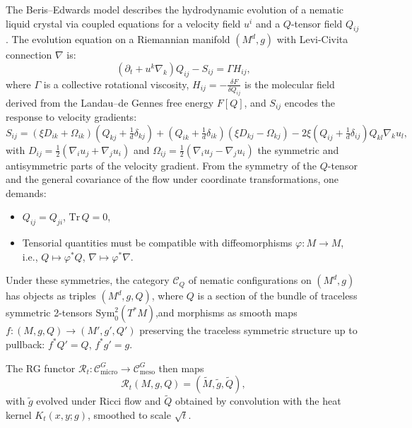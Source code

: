 	The Beris–Edwards model describes the hydrodynamic evolution of a nematic liquid crystal via coupled equations for a velocity field \( u^i \) and a \( Q \)-tensor field \( Q_{ij} \). The evolution equation on a Riemannian manifold \( (M^d, g) \) with Levi-Civita connection \( \nabla \) is:
	\[
	(\partial_t + u^k \nabla_k) Q_{ij} - S_{ij} = \Gamma H_{ij},
	\]
	where \( \Gamma \) is a collective rotational viscosity, \( H_{ij} = - \frac{\delta F}{\delta Q_{ij}} \) is the molecular field derived from the Landau–de Gennes free energy \( F[Q] \), and \( S_{ij} \) encodes the response to velocity gradients:
	\[
	S_{ij} = (\xi D_{ik} + \Omega_{ik})(Q_{kj} + \tfrac{1}{d} \delta_{kj}) + (Q_{ik} + \tfrac{1}{d} \delta_{ik})(\xi D_{kj} - \Omega_{kj}) - 2\xi(Q_{ij} + \tfrac{1}{d} \delta_{ij}) Q_{kl} \nabla_k u_l,
	\]
	with \( D_{ij} = \tfrac{1}{2}(\nabla_i u_j + \nabla_j u_i) \) and \( \Omega_{ij} = \tfrac{1}{2}(\nabla_i u_j - \nabla_j u_i) \) the symmetric and antisymmetric parts of the velocity gradient. From the symmetry of the \( Q \)-tensor and the general covariance of the flow under coordinate transformations, one demands:
	\begin{itemize}
		\item \( Q_{ij} = Q_{ji} \), \( \mathrm{Tr}\,Q = 0 \),
		\item Tensorial quantities must be compatible with diffeomorphisms \( \varphi: M \to M \), i.e., \( Q \mapsto \varphi^* Q \), \( \nabla \mapsto \varphi^* \nabla \).
	\end{itemize}
	
	Under these symmetries, the category \( \mathcal{C}_{Q} \) of nematic configurations on \( (M^d, g) \) has objects as triples \( (M^d, g, Q) \), where \( Q \) is a section of the bundle of traceless symmetric 2-tensors \( \mathrm{Sym}^2_0(T^*M) \),and morphisms as smooth maps \( f: (M, g, Q) \to (M', g', Q') \) preserving the traceless symmetric structure up to pullback: \( f^* Q' = Q \), \( f^* g' = g \).
	
	The RG functor \( \mathcal{R}_t: \mathcal{C}_{\text{micro}}^G \to \mathcal{C}_{\text{meso}}^G \) then maps
	\[
	\mathcal{R}_t(M, g, Q) = (\widetilde{M}, \widetilde{g}, \widetilde{Q}),
	\]
	with \( \widetilde{g} \) evolved under Ricci flow and \( \widetilde{Q} \) obtained by convolution with the heat kernel \( K_t(x,y;g) \), smoothed to scale \( \sqrt{t} \).
	
